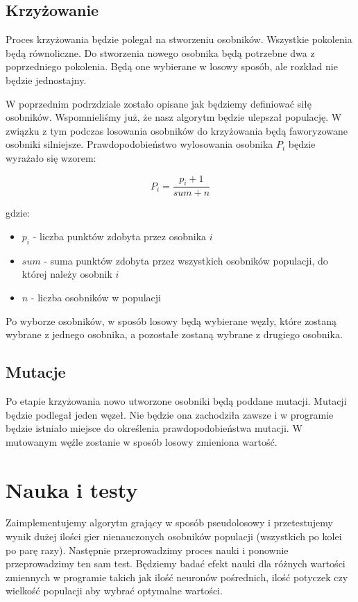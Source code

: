 \documentclass[paper=a4, fontsize=11pt]{scrartcl} %
\numberwithin{equation}{section} %
\numberwithin{figure}{section} %
\numberwithin{table}{section} %
\begin{document}
\subsection{Krzyżowanie}
Proces krzyżowania będzie polegał na stworzeniu osobników. Wszystkie pokolenia będą równoliczne. Do stworzenia nowego osobnika będą potrzebne dwa z poprzedniego pokolenia. Będą one wybierane w losowy sposób, ale rozkład nie będzie jednostajny.

W poprzednim podrzdziale zostało opisane jak będziemy definiować siłę osobników. Wspomnieliśmy już, że nasz algorytm będzie ulepszał populację. W związku z tym podczas losowania osobników do krzyżowania będą faworyzowane osobniki silniejsze. Prawdopodobieństwo wylosowania osobnika ${P_i}$ będzie wyrażało się wzorem:

\begin{equation}
P_i=\frac{p_i + 1}{sum+n}
\end{equation}

gdzie:

\begin{itemize}
	\item ${p_i}$ - liczba punktów zdobyta przez osobnika $i$
	\item $sum$ - suma punktów zdobyta przez wszystkich osobników populacji, do której należy osobnik $i$
	\item $n$ - liczba osobników w populacji
\end{itemize}

Po wyborze osobników, w sposób losowy będą wybierane węzły, które zostaną wybrane z jednego osobnika, a pozostałe zostaną wybrane z drugiego osobnika.

\subsection{Mutacje}
Po etapie krzyżowania nowo utworzone osobniki będą poddane mutacji. Mutacji będzie podlegał jeden węzeł. Nie będzie ona zachodziła zawsze i w programie będzie istniało miejsce do określenia prawdopodobieństwa mutacji. W mutowanym węźle zostanie w sposób losowy zmieniona wartość.

\section{Nauka i testy}
Zaimplementujemy algorytm grający w sposób pseudolosowy i przetestujemy wynik dużej ilości gier nienauczonych osobników populacji (wszystkich po kolei po parę razy). Następnie przeprowadzimy proces nauki i ponownie przeprowadzimy ten sam test. Będziemy badać efekt nauki dla różnych wartości zmiennych w programie takich jak ilość neuronów pośrednich, ilość potyczek czy wielkość populacji aby wybrać optymalne wartości. 


\clearpage
\end{document}
